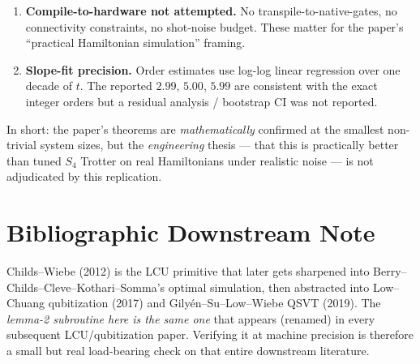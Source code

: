 \documentclass[11pt]{article}
\begin{document}
\begin{enumerate}
        of what happens when the controlled-$U_a/U_b$ blocks pick up depolarizing or
        coherent gate error, or of the resulting ancilla-measurement bias.
  \item \textbf{Compile-to-hardware not attempted.} No transpile-to-native-gates, no
        connectivity constraints, no shot-noise budget. These matter for the paper's
        ``practical Hamiltonian simulation'' framing.
  \item \textbf{Slope-fit precision.} Order estimates use log-log linear regression over one
        decade of $t$. The reported $2.99$, $5.00$, $5.99$ are consistent with the exact
        integer orders but a residual analysis / bootstrap CI was not reported.
\end{enumerate}

\noindent In short: the paper's theorems are \emph{mathematically} confirmed at the smallest
non-trivial system sizes, but the \emph{engineering} thesis --- that this is practically
better than tuned $S_4$ Trotter on real Hamiltonians under realistic noise --- is not
adjudicated by this replication.

\section{Bibliographic Downstream Note}
Childs--Wiebe (2012) is the LCU primitive that later gets sharpened into
Berry--Childs--Cleve--Kothari--Somma's optimal simulation, then abstracted into
Low--Chuang qubitization (2017) and Gily{\'e}n--Su--Low--Wiebe QSVT (2019). The
\emph{lemma-2 subroutine here is the same one} that appears (renamed) in every
subsequent LCU/qubitization paper. Verifying it at machine precision is therefore
a small but real load-bearing check on that entire downstream literature.


\end{document}

